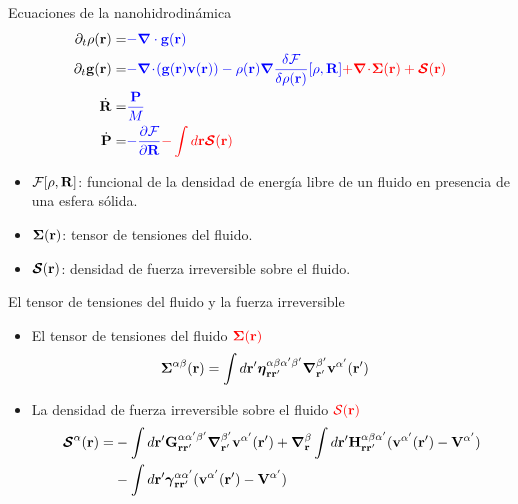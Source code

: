 \documentclass{beamer}
\newcommand{\esc}{\!\cdot\!}
\begin{document}
\begin{frame}{Ecuaciones de la nanohidrodinámica}
\begin{align}
  \partial_t\rho({\bf r})=&{\color{blue} -\boldsymbol{\nabla}\cdot{\bf g}({\bf r})}
\nonumber\\
\partial_t{\bf g}({\bf r})=&{\color{blue} -\boldsymbol{\nabla}\esc{\left({\bf g}({\bf r}){\bf v}({\bf r})\right)}
-\rho({\bf r})\boldsymbol{\nabla}\frac{\delta {\cal F}}{\delta\rho({\bf r})}[\rho,{\bf R}]}
{\color{red} +\boldsymbol{\nabla}\esc\boldsymbol{\Sigma}({\bf r})+\boldsymbol{{\cal S}}({\bf r})}
\nonumber\\
\dot{\bf R}=&{\color{blue} \frac{\bf P}{M}}
\nonumber\\
\dot{\bf P}=&{\color{blue} -\frac{\partial {\cal F}}{\partial {\bf R}}}
{\color{red} -\int d {{\bf r}}\boldsymbol{{\cal S}}({\bf r})}
\nonumber
\end{align}

\begin{itemize}
  \item ${\cal F}[\rho, {\bf R}]$: funcional de la densidad de energía libre de un fluido en presencia de una esfera sólida. 
  \item $\boldsymbol{\Sigma}({\bf r})$: tensor de tensiones del fluido. 
  \item $\boldsymbol{{\cal S}}({\bf r})$: densidad de fuerza irreversible sobre el fluido. 
\end{itemize}
\end{frame}

\begin{frame}{El tensor de tensiones del fluido y la fuerza irreversible}
  \begin{itemize}
    \item<1-> El tensor de tensiones del fluido ${\color{red} \boldsymbol{\Sigma}({\bf r})}$ 
  \begin{align}
  \boldsymbol{\Sigma}^{\alpha\beta}({\bf r})&=
\int d{\bf r}'
\boldsymbol{\eta}^{\alpha\beta\alpha'\beta'}_{{\bf r}{\bf r}'}
\boldsymbol{\nabla}_{{\bf r}'}^{\beta'}{\bf v}^{\alpha'}({\bf r}')
\nonumber
\end{align}
\item<2-> La densidad de fuerza irreversible sobre el fluido ${\color{red} {\cal S}({\bf r})}$
\begin{align}
  \boldsymbol{{\cal S}}^\alpha({\bf r})=&
-\int d{\bf r}'{\bf G}^{\alpha\alpha'\beta'}_{{\bf r}{\bf r}'}
\boldsymbol{\nabla}_{{\bf r}'}^{\beta'} {\bf v}^{\alpha'}({\bf r}')
+\boldsymbol{\nabla}_{{\bf r}}^{\beta}\int d{\bf r}'{\bf H}^{\alpha\beta\alpha'}_{{\bf r}{\bf r}'}
( {\bf v}^{\alpha'}({\bf r}')-{\bf V}^{\alpha'})
\nonumber\\
&-\int d{\bf r}'
\boldsymbol{\gamma}^{\alpha\alpha'}_{{\bf r}{\bf r}'}( {\bf v}^{\alpha'}({\bf r}')
-{\bf V}^{\alpha'})
\nonumber
\end{align}
\end{itemize}
\end{frame}
\end{document}
